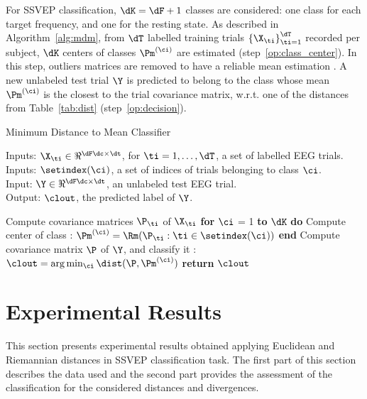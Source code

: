 For SSVEP classification, $\dK = \dF + 1$ classes are considered: one class for each target frequency, and one for the resting state.
As described in Algorithm~\ref{alg:mdm}, from $\dT$ labelled training trials $ \left\{ \X_{\ti} \right\}_{\ti=1}^{\dT}$ recorded per subject, $\dK$ centers of classes $\Pm^{(\ci)}$ are estimated (step~\ref{op:class_center}). 
In this step, outliers matrices are removed to have a reliable mean estimation \cite{barachant2013riemannian}.
A new unlabeled test trial $\Y$ is predicted to belong to the class whose mean $\Pm^{(\ci)}$ is the closest to the trial covariance matrix, w.r.t. one of the distances from Table~\ref{tab:dist} (step~\ref{op:decision}).

\begin{algorithm}
\caption{Minimum Distance to Mean Classifier}
\label{alg:mdm}
	Inputs: $\X_{\ti} \in \Re^{\dF \dc\times\dt}$, for $\ti = 1, \ldots, \dT$, a set of labelled EEG trials. \\
	Inputs: $\setindex(\ci)$, a set of indices of trials belonging to class $\ci$. \\
	Input: $\Y \in \Re^{\dF \dc\times\dt}$, an unlabeled test EEG trial. \\
	Output: $\clout$, the predicted label of $\Y$.
	\begin{algorithmic}[1]
	\State Compute covariance matrices $\P_{\ti}$ of $\X_\ti$ 
	\State \textbf{for} $\ci$ = 1 \textbf{to} $\dK$ \textbf{do}
	\State \quad Compute center of class : $\Pm^{(\ci)}=\Rm(\P_{\ti}:\ti \in \setindex(\ci))$
	\label{op:class_center}
	\State \textbf{end}
	\State Compute covariance matrix $\P$ of $\Y$, and classify it : $\clout = \arg \min_{\ci} \dist(\P, \Pm^{(\ci)})$
	\label{op:decision}
	\State \textbf{return} $\clout$
	\end{algorithmic}
\end{algorithm}


\section{Experimental Results}
\label{sec:expresults}
This section presents experimental results obtained applying Euclidean and Riemannian distances in SSVEP classification task. 
The first part of this section describes the data used and the second part provides the assessment of the classification for the considered distances and divergences. %


